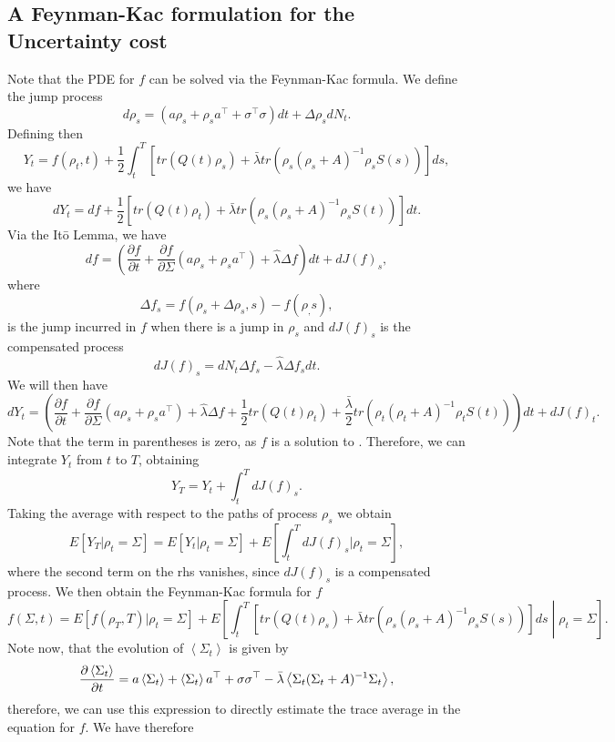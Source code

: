 \subsection{A Feynman-Kac formulation for the Uncertainty cost}

Note that the PDE for $f$ can be solved via the Feynman-Kac formula. We define the jump process
\[
d\rho_s = (a\rho_s + \rho_s a^\top  + \sigma^\top \sigma) dt + \Delta \rho_s dN_t.
\]
Defining then
\[
Y_t = f(\rho_t,t) + \frac{1}{2} \int_t^T \left[tr\left(Q(t)\rho_s\right)+ \bar{\lambda} tr \left(\rho_s(\rho_s+A)^{-1}\rho_s S(s)\right)\right]ds,
\]
we have
\[
dY_t = df + \frac{1}{2}\left[tr\left(Q(t)\rho_t\right)+ \bar{\lambda} tr \left(\rho_s(\rho_s+A)^{-1}\rho_s S(t)\right)\right]dt.
\]
Via the It\=o Lemma, we have
\[
df =\left(\frac{\partial f}{\partial t} + \frac{\partial f}{\partial \Sigma} (a \rho_s + \rho_s a^\top) + \hat{\lambda} \Delta f \right) dt+ d J(f)_s,
\]
where 
\[
\Delta f_s = f(\rho_s + \Delta \rho_s,s) - f(\rho_,s),
\]
is the jump incurred in $f$ when there is a jump in $\rho_s$ and $dJ(f)_s$ is the compensated process
\[
dJ(f)_s = dN_t \Delta f_s - \hat{\lambda} \Delta f_s dt.
\]
We will then have
\[
dY_t = \left(\frac{\partial f}{\partial t} + \frac{\partial f}{\partial \Sigma} (a \rho_s + \rho_s a^\top) + \hat{\lambda} \Delta f + \frac{1}{2}tr\left(Q(t)\rho_t\right)+ \frac{\bar{\lambda}}{2} tr \left(\rho_t(\rho_t+A)^{-1}\rho_t S(t)\right)\right)dt + dJ(f)_t.
\]
Note that the term in parentheses is zero, as $f$ is a solution to . Therefore, we can integrate $Y_t$ from $t$ to $T$, obtaining
\[
Y_T = Y_t + \int_t^T dJ(f)_s.
\]
Taking the average with respect to the paths of process $\rho_s$ we obtain
\[
E\left[Y_T|\rho_t=\Sigma\right]=E\left[Y_t|\rho_t=\Sigma\right] + E\left[\int_t^T dJ(f)_s|\rho_t=\Sigma\right],
\]
where the second term on the rhs vanishes, since $dJ(f)_s$ is a compensated process. We then obtain the Feynman-Kac formula for $f$
\begin{equation}
f(\Sigma,t) =E[f(\rho_T,T)|\rho_t=\Sigma] + E\left[\int_t^T\left[tr\left(Q(t)\rho_s\right)+ \bar{\lambda} tr \left(\rho_s(\rho_s+A)^{-1}\rho_s S(s) \right)\right]ds \middle| \rho_t=\Sigma\right].
\end{equation}
Note now, that the evolution of $\left<\Sigma_t\right>$ is given by
\[
\frac{\partial \left<\Sigma_t\right>}{\partial t} = a \left<\Sigma_t\right> + \left<\Sigma_t\right> a^\top + \sigma\sigma^\top- \bar{\lambda}\left< \Sigma_t(\Sigma_t + A)^{-1} \Sigma_t\right>,
\]
therefore, we can use this expression to directly estimate the trace average in the equation for $f$. We have therefore
